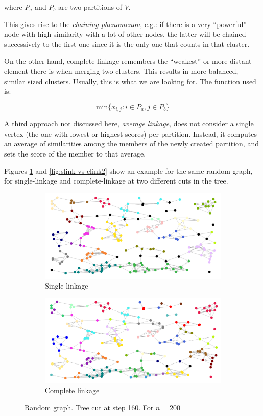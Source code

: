 \documentclass[12pt,a4paper]{article}
\begin{document}
where ${P_a}$ and $P_b$ are two partitions of $V$.

This gives rise to the \emph{chaining phenomenon}, e.g.: if
there is a very ``powerful'' node with high similarity with a lot of
other nodes, the latter will be chained successively to the first
one since it is the only one that counts in that cluster.

On the other hand, complete linkage remembers the ``weakest'' or more
distant element there is when merging two clusters. This results in
more balanced, similar sized clusters. Usually, this is what we are
looking for. The function used is:

$$ \mathrm{min}\{x_{i,j} : i \in P_a, j \in P_b\} $$

A third approach not discussed here, \emph{average linkage}, does not
consider a single vertex (the one with lowest or highest scores) per
partition. Instead, it computes an average of similarities among the
members of the newly created partition, and sets the score of the
member to that average.

Figures \ref{fig:slink-vs-clink} and \ref{fig:slink-vs-clink2} show an
example for the same random graph, for single-linkage and
complete-linkage at two different cuts in the tree.

\begin{figure}
  \centering
  \begin{subfigure}[h]{0.49\textwidth}
    \includegraphics[width=\linewidth]{img/slink-200-160.png}
    \caption{Single linkage}
  \end{subfigure}
  \begin{subfigure}[h]{0.49\textwidth}
    \includegraphics[width=\linewidth]{img/clink-200-160.png}
    \caption{Complete linkage}
  \end{subfigure}
  \caption{Random graph. Tree cut at step 160. For $n = 200$}
  \label{fig:slink-vs-clink}
\end{figure}
\end{document}
